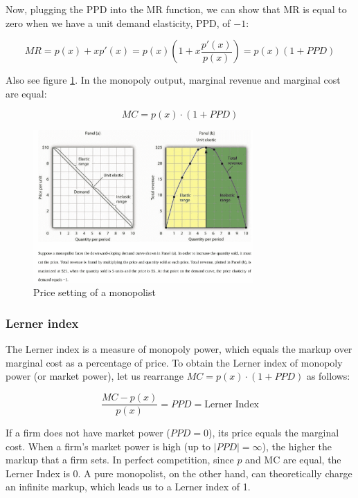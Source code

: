 \documentclass[
  12pt,
  oneside]{book}
\theoremstyle{definition}
\theoremstyle{definition}
\theoremstyle{definition}
\theoremstyle{definition}
\theoremstyle{remark}
\begin{document}
Now, plugging the PPD into the MR function, we can show that MR is equal to zero when we have a unit demand elasticity, PPD, of \(-1\):

\[ MR = p(x) + xp'(x) = p(x)\left(1 + x\frac{p'(x)}{p(x)}\right) = p(x)\left(1 + PPD\right) \]

Also see figure \ref{fig:ppd}. In the monopoly output, marginal revenue and marginal cost are equal:

\[ MC = p(x) \cdot \left(1 + PPD\right) \]

\begin{figure}
\centering
\includegraphics[width=0.75\textwidth,height=\textheight]{fig/ppd.png}
\caption[\label{fig:ppd} Price setting of a monopolist]{\label{fig:ppd} Price setting of a monopolist\footnotemark{}}
\end{figure}

\hypertarget{lerner-index}{%
\subsubsection*{Lerner index}\label{lerner-index}}

The Lerner index is a measure of monopoly power, which equals the markup over marginal cost as a percentage of price. To obtain the Lerner index of monopoly power (or market power), let us rearrange \(MC = p(x) \cdot \left(1 + PPD\right)\) as follows:

\[ \frac{MC - p(x)}{p(x)} = PPD = \text{Lerner Index} \]

If a firm does not have market power (\(PPD = 0\)), its price equals the marginal cost. When a firm's market power is high (up to \(|PPD| = \infty\)), the higher the markup that a firm sets. In perfect competition, since \(p\) and MC are equal, the Lerner Index is 0. A pure monopolist, on the other hand, can theoretically charge an infinite markup, which leads us to a Lerner index of 1.
\end{document}
